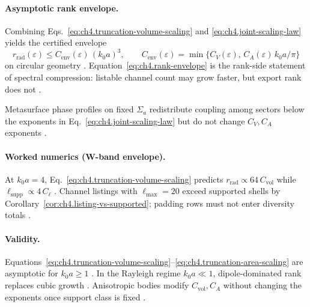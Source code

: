 \paragraph{Asymptotic rank envelope.}
Combining Eqs.~\eqref{eq:ch4.truncation-volume-scaling} and \eqref{eq:ch4.joint-scaling-law} yields the certified envelope
\begin{equation}
\label{eq:ch4.rank-envelope}
r_{\mathrm{rad}}(\varepsilon)
\le
C_{\mathrm{env}}(\varepsilon)\,(k_{0}a)^{3},
\qquad
C_{\mathrm{env}}(\varepsilon)=\min\{C_{V}(\varepsilon),\,C_{A}(\varepsilon)\,k_{0}a/\pi\}
\end{equation}
on circular geometry \cite{hansen1988,stratton1941,collin2001,jackson1999}. Equation~\eqref{eq:ch4.rank-envelope} is the rank-side
statement of spectral compression: listable channel count may grow faster, but export rank does not \cite{devaney2004,harrington2001}.

\begin{proposition}
\label{prop:ch4.scaling-phase-invariant}
Metasurface phase profiles on fixed \(\Sigma_{a}\) redistribute coupling among sectors below the exponents in
Eq.~\eqref{eq:ch4.joint-scaling-law} but do not change \(C_{V},C_{A}\) exponents \cite{devaney2004,hansen1988,collin2001,stratton1941}.
\end{proposition}

\paragraph{Worked numerics (W-band envelope).}
At \(k_{0}a=4\), Eq.~\eqref{eq:ch4.truncation-volume-scaling} predicts \(r_{\mathrm{rad}}\propto64\,C_{\mathrm{vol}}\) while
\(\ell_{\mathrm{supp}}\propto4\,C_{\ell}\) \cite{hansen1988,jackson1999,harrington2001}. Channel listings with \(\ell_{\max}=20\) exceed
supported shells by Corollary~\ref{cor:ch4.listing-vs-supported}; padding rows must not enter diversity totals \cite{devaney2004,stratton1941}.

\paragraph{Validity.}
Equations~\eqref{eq:ch4.truncation-volume-scaling}--\eqref{eq:ch4.truncation-area-scaling} are asymptotic for \(k_{0}a\ge1\)
\cite{jackson1999,hansen1988}. In the Rayleigh regime \(k_{0}a\ll1\), dipole-dominated rank replaces cubic growth
\cite{jackson1999,stratton1941,harrington2001}. Anisotropic bodies modify \(C_{\mathrm{vol}},C_{A}\) without changing the exponents once
support class is fixed \cite{devaney2004,collin2001}.


